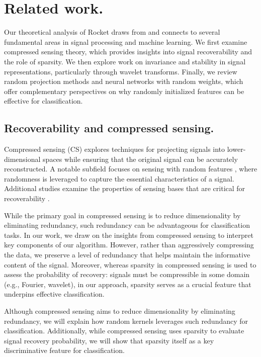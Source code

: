 \section{Related work.}
\label{related}

Our theoretical analysis of Rocket draws from and connects to several fundamental areas in signal processing and machine learning. We first examine compressed sensing theory, which provides insights into signal recoverability and the role of sparsity. We then explore work on invariance and stability in signal representations, particularly through wavelet transforms. Finally, we review random projection methods and neural networks with random weights, which offer complementary perspectives on why randomly initialized features can be effective for classification.


\subsection{Recoverability and compressed sensing.}

Compressed sensing (CS) \cite{donoho2006compressed,candes2008introduction} explores techniques for projecting signals into lower-dimensional spaces while ensuring that the original signal can be accurately reconstructed. A notable subfield focuses on sensing with random features \cite{baraniuk2008simple,tropp2006random,candes2006near,haupt2010toeplitz,bajwa2007toeplitz}, where randomness is leveraged to capture the essential characteristics of a signal. Additional studies examine the properties of sensing bases that are critical for recoverability \cite{cai2011orthogonal,donoho2001uncertainty}.

While the primary goal in compressed sensing is to reduce dimensionality by eliminating redundancy, such redundancy can be advantageous for classification tasks. In our work, we draw on the insights from compressed sensing to interpret key components of our algorithm. However, rather than aggressively compressing the data, we preserve a level of redundancy that helps maintain the informative content of the signal. Moreover, whereas sparsity in compressed sensing is used to assess the probability of recovery: signals must be compressible in some domain (e.g., Fourier, wavelet), in our approach, sparsity serves as a crucial feature that underpins effective classification.

Although compressed sensing aims to reduce dimensionality by eliminating redundancy, we will explain how random kernels leverages such redundancy for classification. Additionally, while compressed sensing uses sparsity to evaluate signal recovery probability, we will show that sparsity itself as a key discriminative feature for classification.


